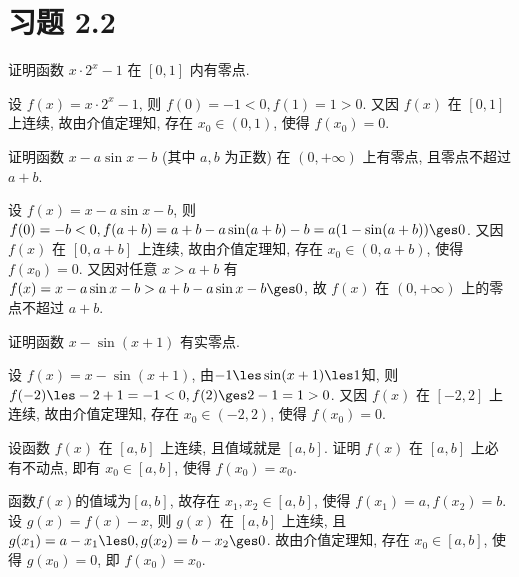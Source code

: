 \section{习题 2.2}

\begin{exercise}[2.2.1]
    证明函数 $x \cdot 2^x - 1$ 在 $[0,1]$ 内有零点.
\end{exercise}

\begin{solution}
    设 $f(x) = x \cdot 2^x - 1$, 则 $f(0) = -1 < 0, f(1) = 1 > 0$. 又因 $f(x)$ 在 $[0,1]$ 上连续, 故由介值定理知, 存在 $x_0 \in (0,1)$, 使得 $f(x_0) = 0$.
\end{solution}

\begin{exercise}[2.2.2]
    证明函数 $x - a\sin x - b$ (其中 $a,b$ 为正数) 在 $(0, +\infty)$ 上有零点, 且零点不超过 $a+b$.
\end{exercise}

\begin{solution}
    设 $f(x) = x - a\sin x - b$, 则 $f(0) = -b < 0, f(a+b) = a + b - a\sin(a+b) - b = a(1-\sin(a+b)) \ges 0$. 又因 $f(x)$ 在 $[0, a+b]$ 上连续, 故由介值定理知, 存在 $x_0 \in (0, a+b)$, 使得 $f(x_0) = 0$. 又因对任意 $x > a+b$ 有 $f(x) = x - a\sin x - b > a + b - a \sin x - b \ges 0$, 故 $f(x)$ 在 $(0, +\infty)$ 上的零点不超过 $a+b$.
\end{solution}

\begin{exercise}[2.2.3]
    证明函数 $x - \sin(x+1)$ 有实零点.
\end{exercise}

\begin{solution}
    设 $f(x) = x - \sin(x+1)$, 由$ -1 \les \sin(x+1) \les 1$知, 
    则 $f(-2) \les -2 + 1 = -1 < 0, f(2) \ges 2 - 1 = 1 > 0$. 又因 $f(x)$ 在 $[-2,2]$ 上连续, 故由介值定理知, 存在 $x_0 \in (-2,2)$, 使得 $f(x_0) = 0$.
\end{solution}

\begin{exercise}[2.2.4]
    设函数 $f(x)$ 在 $[a,b]$ 上连续, 且值域就是 $[a,b]$. 证明 $f(x)$ 在 $[a,b]$ 上必有不动点, 即有 $x_0 \in [a,b]$, 使得 $f(x_0)=x_0$.
\end{exercise}

\begin{solution}
    函数$f(x)$的值域为$[a,b]$, 故存在 $x_1, x_2 \in [a,b]$, 使得 $f(x_1) = a, f(x_2) = b$. 设 $g(x) = f(x) - x$, 则 $g(x)$ 在 $[a,b]$ 上连续, 且 $g(x_1) = a - x_1 \les 0, g(x_2) = b - x_2 \ges 0$. 故由介值定理知, 存在 $x_0 \in [a,b]$, 使得 $g(x_0) = 0$, 即 $f(x_0) = x_0$.
\end{solution}

